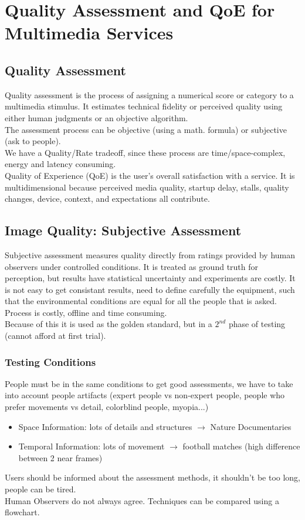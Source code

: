 \section{Quality Assessment and QoE for Multimedia Services}
\subsection{Quality Assessment}
Quality assessment is the process of assigning a numerical score or category to a multimedia stimulus. It estimates technical fidelity or perceived quality using either human judgments or an objective algorithm.\\
The assessment process can be objective (using a math. formula) or subjective (ask to people).\\
We have a Quality/Rate tradeoff, since these process are time/space-complex, energy and latency consuming.\\
Quality of Experience (QoE) is the user's overall satisfaction with a service. It is multidimensional because perceived media quality, startup delay, stalls, quality changes, device, context, and expectations all contribute.
\subsection{Image Quality: Subjective Assessment}
Subjective assessment measures quality directly from ratings provided by human observers under controlled conditions. It is treated as ground truth for perception, but results have statistical uncertainty and experiments are costly.
It is not easy to get consistant results, need to define carefully the equipment, such that the environmental conditions are equal for all the people that is asked. Process is costly, offline and time consuming.\\
Because of this it is used as the golden standard, but in a $2^{nd}$ phase of testing (cannot afford at first trial).
\subsubsection{Testing Conditions}
People must be in the same conditions to get good assessments, we have to take into account people artifacts (expert people vs non-expert people, people who prefer movements vs detail, colorblind people, myopia...)
\begin{itemize}
    \item Space Information: lots of details and structures $\to$ Nature Documentaries
    \item Temporal Information: lots of movement $\to$ football matches (high difference between 2 near frames)
\end{itemize}
Users should be informed about the assessment methods, it shouldn't be too long, people can be tired.\\
Human Observers do not always agree. Techniques can be compared using a flowchart.
